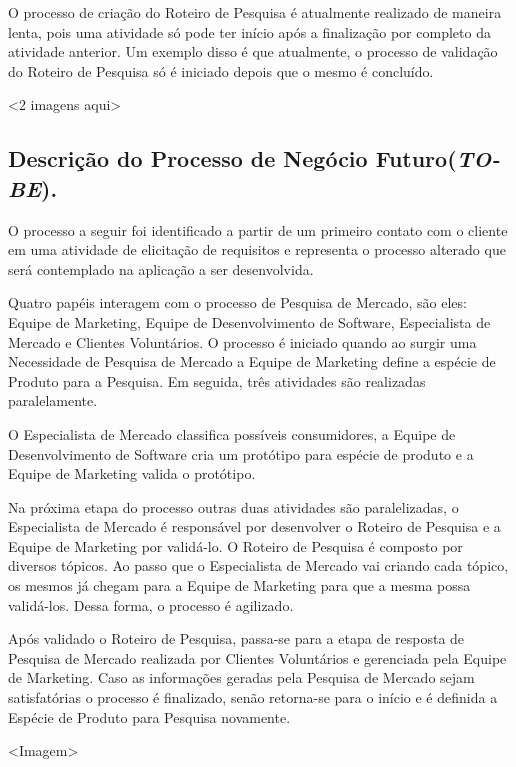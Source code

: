 		O processo de criação do Roteiro de Pesquisa é atualmente realizado de maneira lenta, pois uma atividade só pode ter início após a finalização por completo da atividade anterior. Um exemplo disso é que atualmente, o processo de validação do Roteiro de Pesquisa só é iniciado depois que o mesmo é concluído.

		<2 imagens aqui>


	\subsection{Descrição do Processo de Negócio Futuro(\textit{TO-BE}).}

	O processo a seguir foi identificado a partir de um primeiro contato com o cliente em uma atividade de elicitação de requisitos e representa o processo alterado que será contemplado na aplicação a ser desenvolvida.

	Quatro papéis interagem com o processo de Pesquisa de Mercado, são eles: Equipe de Marketing, Equipe de Desenvolvimento de Software, Especialista de Mercado e Clientes Voluntários. O processo é iniciado quando ao surgir uma Necessidade de Pesquisa de Mercado a Equipe de Marketing define a espécie de Produto para a Pesquisa. Em seguida, três atividades são realizadas paralelamente. 

	O Especialista de Mercado classifica possíveis consumidores, a Equipe de Desenvolvimento de Software cria um protótipo para espécie de produto e a Equipe de Marketing valida o protótipo.

	Na próxima etapa do processo outras duas atividades são paralelizadas, o Especialista de Mercado é responsável por desenvolver o Roteiro de Pesquisa e a Equipe de Marketing por validá-lo. O Roteiro de Pesquisa é composto por diversos tópicos. Ao passo que o Especialista de Mercado vai criando cada tópico, os mesmos já chegam para a Equipe de Marketing para que a mesma possa validá-los. Dessa forma, o processo é agilizado.

	Após validado o Roteiro de Pesquisa, passa-se para a etapa de resposta de Pesquisa de Mercado realizada por Clientes Voluntários e gerenciada pela Equipe de Marketing. Caso as informações geradas pela Pesquisa de Mercado sejam satisfatórias o processo é finalizado, senão retorna-se para o início e é definida a Espécie de Produto para Pesquisa novamente.


	<Imagem>
